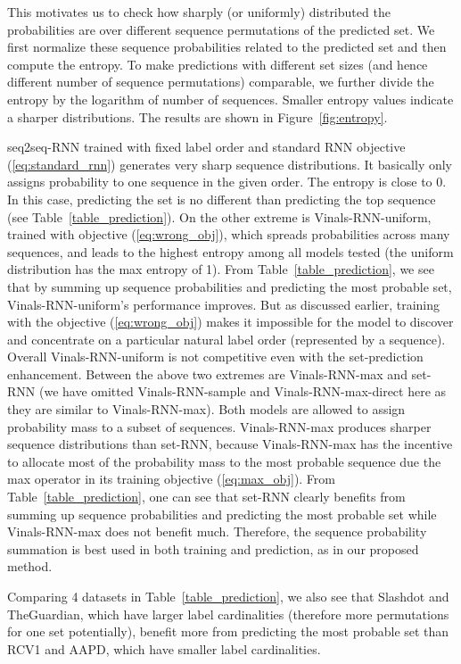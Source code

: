 This motivates us to check how sharply (or uniformly) distributed the probabilities are over different sequence permutations of the predicted set. We first normalize these sequence probabilities related to the predicted set and then compute the entropy. To make predictions with different set sizes (and hence different number of sequence permutations) comparable, we further divide the entropy by the logarithm of number of sequences. Smaller entropy values indicate a sharper distributions. The results are shown in Figure~\ref{fig:entropy}.

seq2seq-RNN trained with fixed label order and standard RNN objective (\ref{eq:standard_rnn}) generates very sharp sequence distributions. It basically only assigns probability to one sequence in the given order. The entropy is close to 0. In this case, predicting the set is no different than predicting the top sequence (see Table~\ref{table_prediction}). On the other extreme is Vinals-RNN-uniform, trained with objective (\ref{eq:wrong_obj}), which spreads probabilities across many sequences, and leads to the highest entropy among all models tested (the uniform distribution has the max entropy of 1). From Table~\ref{table_prediction}, we see that by summing up sequence probabilities and predicting the most probable set,  Vinals-RNN-uniform's performance  improves. But as  discussed earlier, training with the objective (\ref{eq:wrong_obj}) makes it impossible for the model to discover and concentrate on a particular natural label order (represented by a sequence). Overall Vinals-RNN-uniform is not competitive even with the set-prediction enhancement. Between the above two extremes are Vinals-RNN-max and set-RNN (we have omitted Vinals-RNN-sample and Vinals-RNN-max-direct here as they are similar to Vinals-RNN-max). Both models are allowed to assign probability mass to a subset of sequences. Vinals-RNN-max produces sharper sequence distributions than set-RNN, because  Vinals-RNN-max has the incentive to allocate most of the probability mass to the most probable sequence due the max operator in its training objective (\ref{eq:max_obj}). From Table~\ref{table_prediction}, one can see that set-RNN clearly benefits from summing up sequence probabilities and predicting the most probable set while Vinals-RNN-max does not benefit much. Therefore, the sequence probability summation is best used in both training and prediction, as in our proposed method.

Comparing 4 datasets in Table~\ref{table_prediction}, we also see that Slashdot and TheGuardian, which have larger label cardinalities (therefore more permutations for one set potentially), benefit more from predicting the most probable set than RCV1 and AAPD, which have smaller label cardinalities.

